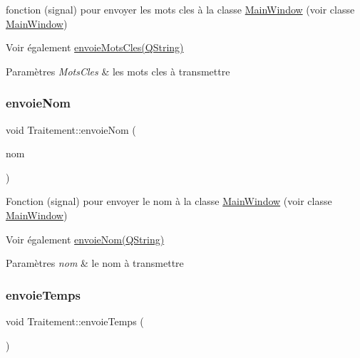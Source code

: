 fonction (signal) pour envoyer les mots cles à la classe \hyperlink{classMainWindow}{Main\+Window} (voir classe \hyperlink{classMainWindow}{Main\+Window}) 

\begin{DoxySeeAlso}{Voir également}
\hyperlink{classTraitement_a4df691c4f46371e6c2b6b4c4df102819}{envoie\+Mots\+Cles(\+Q\+String)} 
\end{DoxySeeAlso}

\begin{DoxyParams}{Paramètres}
{\em Mots\+Cles} & les mots cles à transmettre \\
\hline
\end{DoxyParams}
\mbox{\label{classTraitement_a9f84743a77b0074f209eda21d32ee95b}} 
\subsubsection{\texorpdfstring{envoie\+Nom}{envoieNom}}
{\footnotesize\ttfamily void Traitement\+::envoie\+Nom (\begin{DoxyParamCaption}\item[{Q\+String}]{nom }\end{DoxyParamCaption})\hspace{0.3cm}{\ttfamily [signal]}}



Fonction (signal) pour envoyer le nom à la classe \hyperlink{classMainWindow}{Main\+Window} (voir classe \hyperlink{classMainWindow}{Main\+Window}) 

\begin{DoxySeeAlso}{Voir également}
\hyperlink{classTraitement_a9f84743a77b0074f209eda21d32ee95b}{envoie\+Nom(\+Q\+String)} 
\end{DoxySeeAlso}

\begin{DoxyParams}{Paramètres}
{\em nom} & le nom à transmettre \\
\hline
\end{DoxyParams}
\mbox{\label{classTraitement_ae57543af34e05b74a7af460c0e74e87f}} 
\subsubsection{\texorpdfstring{envoie\+Temps}{envoieTemps}}
{\footnotesize\ttfamily void Traitement\+::envoie\+Temps (\begin{DoxyParamCaption}\item[{Q\+String}]{ }\end{DoxyParamCaption})\hspace{0.3cm}{\ttfamily [signal]}}



